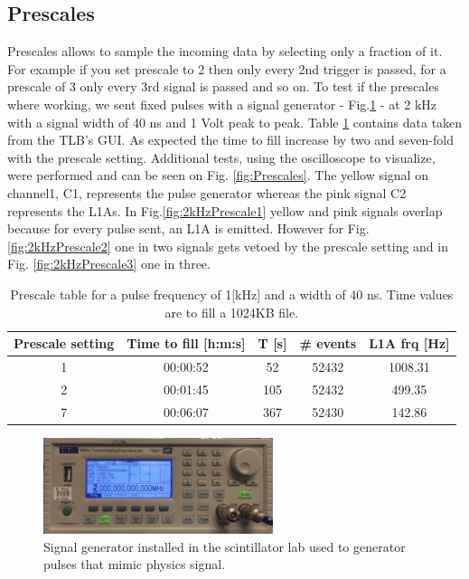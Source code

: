 \subsection{Prescales}
\label{Prescales}

Prescales allows to sample the incoming data by selecting only a fraction of it. For example if you set prescale to 2 then only every 2nd trigger is passed, for a prescale of 3 only every 3rd signal is passed and so on. To test if the prescales where working, we sent fixed pulses with a signal generator - Fig.\ref{fig:SignalGenerator} - at 2 kHz with a signal width of 40 ns and 1 Volt peak to peak. Table \ref{table:prescale} contains data taken from the TLB's GUI. As expected the time to fill increase by two and seven-fold with the prescale setting. Additional tests, using the oscilloscope to visualize, were performed and can be seen on Fig. \ref{fig:Prescales}. The yellow signal on channel1, C1, represents the pulse generator whereas the pink signal C2 represents the L1As. In  Fig.\ref{fig:2kHzPrescale1} yellow and pink signals overlap because for every pulse sent, an L1A is emitted. However for Fig.\ref{fig:2kHzPrescale2} one in two signals gets vetoed by the prescale setting and in Fig. \ref{fig:2kHzPrescale3} one in three.

\begin{table}[htbp!]
\caption{Prescale table for a pulse frequency of 1[kHz] and a width of 40 ns. Time values are to fill a 1024KB file.}
\centering
\label{table:prescale}
\begin{tabular}{c c c c c}
\toprule
Prescale setting & Time to fill [h:m:s] & T [s] & \# events & L1A frq [Hz] \\
\midrule
1 & 00:00:52 & 52 & 52432 & 1008.31 \\
2 & 00:01:45 & 105 & 52432 & 499.35 \\
7 & 00:06:07 & 367 & 52430 & 142.86 \\
\bottomrule
\end{tabular}
\end{table}


\begin{figure}[htbp!] 
\centering    
\includegraphics[width=0.6\textwidth]{SignalGenerator5Mhz.jpg}
\caption[Signal Generator]{Signal generator installed in the scintillator lab used to generator pulses that mimic physics signal.}
\label{fig:SignalGenerator}
\end{figure}

